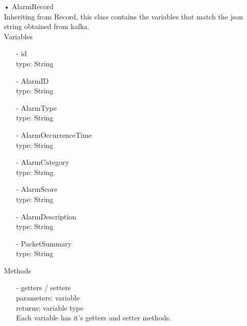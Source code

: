 \documentclass[oneside, english, final]{design}
\begin{document}
\begin{itemize}
	\item[•]AlarmRecord
	      \\Inheriting from Record, this class contains the variables that match the json string obtained from kafka.
	      \\Variables
	      \begin{itemize}
		      \item[-] id
		            \\type: String
		      \item[-] AlarmID
		            \\type: String
		      \item[-] AlarmType
		            \\type: String
		      \item[-] AlarmOccurrenceTime
		            \\type: String
		      \item[-] AlarmCategory
		            \\type: String
		      \item[-] AlarmScore
		            \\type: String
		      \item[-] AlarmDescription
		            \\type: String
		      \item[-] PacketSummary
		            \\type: String

	      \end{itemize}
	      Methods
	      \begin{itemize}
		      \item[-]getters / setters
		            \\parameters: variable
		            \\returns: variable type
		            \\Each variable has it's getters and setter methods.
	      \end{itemize}


\end{itemize}
\end{document}
